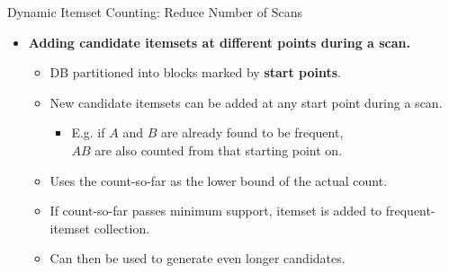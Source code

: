 \begin{frame}{Dynamic Itemset Counting: Reduce Number of Scans}
	\begin{itemize}
		\item \textbf{Adding candidate itemsets at different points during a 
		scan.}
		\begin{itemize}
			\item DB partitioned into blocks marked by 
			\textbf{\color{airforceblue}start points}.
			\item New candidate itemsets can be added at any start point during 
			a scan.
			\begin{itemize}
				\item E.g. if $A$ and $B$ are already found to be frequent, \\
				$AB$ are also counted from that starting point on.
			\end{itemize}
			\item Uses the count-so-far as the lower bound of the actual count.
			\item If count-so-far passes minimum support, itemset is added to 
			frequent-itemset collection.
			\item Can then be used to generate even longer candidates.
		\end{itemize}
	\end{itemize}
\end{frame}

